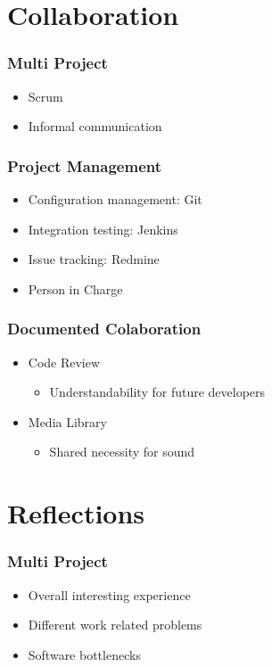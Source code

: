 	\section{Collaboration}
		\begin{frame}
			\frametitle{Multi Project}
			\begin{itemize}
				\item Scrum
				\item Informal communication
			\end{itemize}
		\end{frame}
		
		\begin{frame}
			\frametitle{Project Management}
			\begin{itemize}
				\item Configuration management: Git
				\item Integration testing: Jenkins
				\item Issue tracking: Redmine
				\item Person in Charge
			\end{itemize}
		\end{frame}
		
		\begin{frame}
			\frametitle{Documented Colaboration}
			\begin{itemize}
				\item Code Review
				\begin{itemize}
					\item Understandability for future developers
				\end{itemize}
				\item Media Library
					\begin{itemize}
					\item Shared necessity for sound
					\end{itemize}
			\end{itemize}
		\end{frame}
		
		
	\section{Reflections}
		
		\begin{frame}
			\frametitle{Multi Project}
			\begin{itemize}
				\item Overall interesting experience
				\item Different work related problems
				\item Software bottlenecks
			\end{itemize}
		\end{frame}
		
